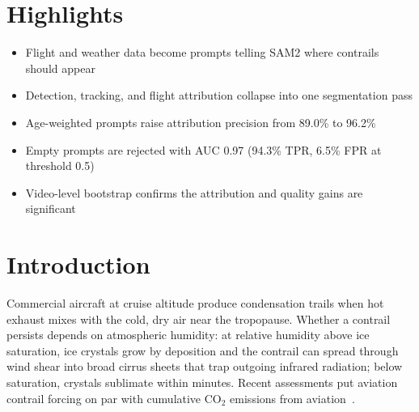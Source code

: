 \documentclass[review]{elsarticle}
\begin{document}
\section*{Highlights}
\begin{itemize}
\item Flight and weather data become prompts telling SAM2 where contrails should appear
\item Detection, tracking, and flight attribution collapse into one segmentation pass
\item Age-weighted prompts raise attribution precision from 89.0\% to 96.2\%
\item Empty prompts are rejected with AUC 0.97 (94.3\% TPR, 6.5\% FPR at threshold 0.5)
\item Video-level bootstrap confirms the attribution and quality gains are significant
\end{itemize}

\section{Introduction}

Commercial aircraft at cruise altitude produce condensation trails when hot exhaust mixes with the cold, dry air near the tropopause. Whether a contrail persists depends on atmospheric humidity: at relative humidity above ice saturation, ice crystals grow by deposition and the contrail can spread through wind shear into broad cirrus sheets that trap outgoing infrared radiation; below saturation, crystals sublimate within minutes. Recent assessments put aviation contrail forcing on par with cumulative CO$_2$ emissions from aviation~\cite{lee2021contribution, teoh2023global}.
\end{document}
